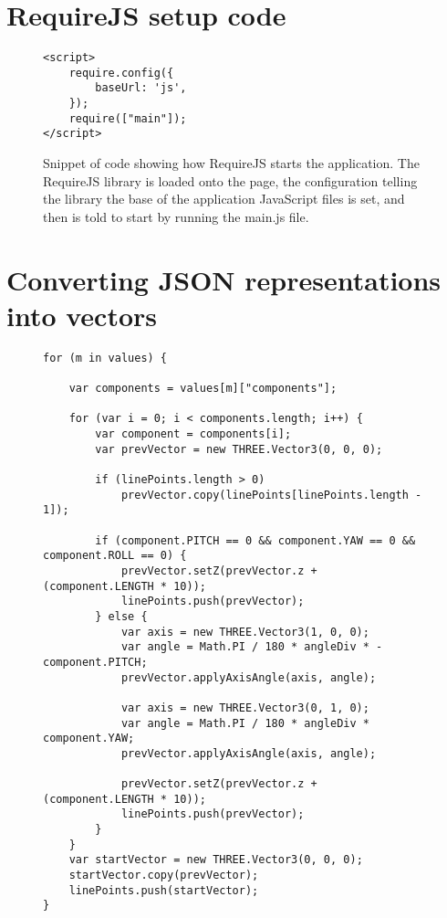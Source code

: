 \section{RequireJS setup code}
\label{code:requireJS}
\begin{figure}[h!]
\caption{Snippet of code showing how RequireJS starts the application. The RequireJS library is loaded onto the page, the configuration telling the library the base of the application JavaScript files is set, and then is told to start by running the main.js file.}
\begin{lstlisting}
<script>
    require.config({
        baseUrl: 'js',
    });
    require(["main"]);
</script>
\end{lstlisting}
\end{figure}

\clearpage

\section{Converting JSON representations into vectors}
\label{code:jsonmovesJS}
\begin{figure}[h!]
\caption{}
\begin{lstlisting}
for (m in values) {

    var components = values[m]["components"];

    for (var i = 0; i < components.length; i++) {
        var component = components[i];
        var prevVector = new THREE.Vector3(0, 0, 0);

        if (linePoints.length > 0)
            prevVector.copy(linePoints[linePoints.length - 1]);

        if (component.PITCH == 0 && component.YAW == 0 && component.ROLL == 0) {
            prevVector.setZ(prevVector.z + (component.LENGTH * 10));
            linePoints.push(prevVector);
        } else {
            var axis = new THREE.Vector3(1, 0, 0);
            var angle = Math.PI / 180 * angleDiv * -component.PITCH;
            prevVector.applyAxisAngle(axis, angle);

            var axis = new THREE.Vector3(0, 1, 0);
            var angle = Math.PI / 180 * angleDiv * component.YAW;
            prevVector.applyAxisAngle(axis, angle);

            prevVector.setZ(prevVector.z + (component.LENGTH * 10));
            linePoints.push(prevVector);
        }
    }
    var startVector = new THREE.Vector3(0, 0, 0);
    startVector.copy(prevVector);
    linePoints.push(startVector);
}
\end{lstlisting}
\end{figure}

